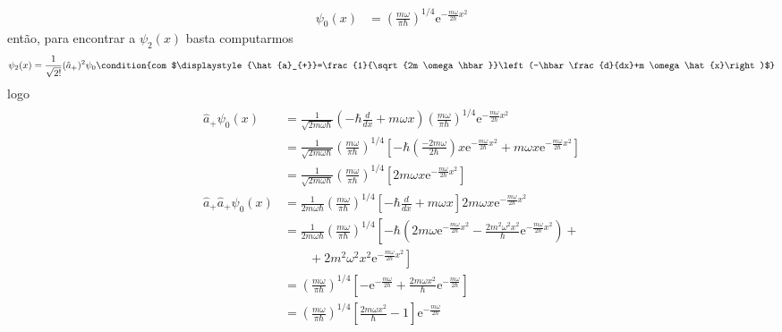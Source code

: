 \begin{prob}
\begin{sol}
\begin{enumerate}[label=\alph *)]
\begin{align}
					\psi_{0}(x) &= \left(\frac{m \omega}{\pi \hbar}\right)^{1/4}\mathrm{e}^{-\frac{m \omega}{2 \hbar}x^{2}}
				\end{align}
				então, para encontrar a $\psi_{2}(x)$ basta computarmos
				\begin{dmath*}
					\psi_{2}(x) = \frac{1}{\sqrt{2!}}(\hat{a}_{+})^{2} \psi_{0}\condition{com $\displaystyle{\hat{a}_{+}}=\frac{1}{\sqrt{2m \omega \hbar}}\left(-\hbar \frac{d}{dx}+m \omega \hat{x}\right)$}
				\end{dmath*}
				logo
				\begin{align}
						\begin{split}
							\hat{a}_{+} \psi_{0}(x) &= \frac{1}{\sqrt{2m \omega \hbar}}\left(-\hbar \frac{d}{dx}+m \omega x\right)\left(\frac{m \omega}{\pi \hbar}\right)^{1/4}\mathrm{e}^{-\frac{m \omega}{2 \hbar}x^{2}}\\
																			&= \frac{1}{\sqrt{2m \omega \hbar}}\left(\frac{m \omega}{\pi \hbar}\right)^{1/4}\left[-\hbar \left(\frac{-2m \omega}{2\hbar}\right)x \mathrm{e}^{-\frac{m \omega}{2\hbar}x^{2}}+m \omega x \mathrm{e}^{-\frac{m \omega}{2\hbar}x^{2}}\right]\\
																			&= \frac{1}{\sqrt{2m \omega \hbar}}\left(\frac{m \omega}{\pi \hbar}\right)^{1/4}\left[2m \omega x \mathrm{e}^{-\frac{m \omega}{2 \hbar}x^{2}}\right]\\
							\hat{a}_{+}\hat{a}_{+} \psi_{0}(x) &= \frac{1}{2m \omega \hbar}\left(\frac{m \omega}{\pi \hbar}\right)^{1/4}\left[-\hbar \frac{d}{dx}+m \omega x\right] 2m \omega x \mathrm{e}^{-\frac{m \omega}{2 \hbar}x^{2}}\\
																								 &= \frac{1}{2m \omega \hbar}\left(\frac{m \omega}{\pi \hbar}\right)^{1/4}\left[-\hbar \left(2m \omega \mathrm{e}^{-\frac{m \omega}{2 \hbar}x^{2}}-\frac{2m^{2} \omega^{2} x^{2}}{\hbar}\mathrm{e}^{-\frac{m \omega}{2 \hbar}x^{2}}\right)+\right.\\
																								 &\left.\qquad +2m^{2} \omega^{2} x^{2}\mathrm{e}^{-\frac{m \omega}{2\hbar}x^{2}} \right]\\
																								 &= \left(\frac{m \omega}{\pi \hbar}\right)^{1/4}\left[-\mathrm{e}^{-\frac{m\omega}{2\hbar}}+\frac{2m \omega x^{2}}{\hbar}\mathrm{e}^{-\frac{m\omega}{2\hbar}}\right]\\
																								 &= \left(\frac{m \omega}{\pi \hbar}\right)^{1/4}\left[\frac{2m \omega x^{2}}{\hbar}-1\right]\mathrm{e}^{-\frac{m \omega}{2\hbar}}
						\end{split}
				\end{align}

\end{enumerate}
\end{sol}
\end{prob}
